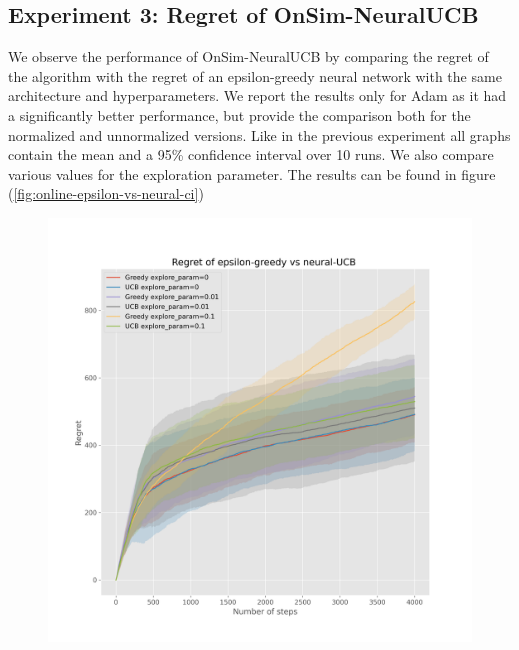 \documentclass{article}
\begin{document}
\subsection{Experiment 3: Regret of OnSim-NeuralUCB}
We observe the performance of OnSim-NeuralUCB by comparing the regret of the algorithm with the regret of an epsilon-greedy
neural network with the same architecture and hyperparameters. We report the results only for Adam as it had a significantly better performance,
but provide the comparison both for the normalized and unnormalized versions.
Like in the previous experiment all graphs contain the mean and a 95\% confidence interval over 10 runs.
 We also compare various values for the exploration parameter. The results can be found in figure (\ref{fig:online-epsilon-vs-neural-ci})

\begin{figure}[!h]
  \centering
  \begin{minipage}{.45\textwidth}
    \centering
    \includegraphics[width=\linewidth]{online-epsilon-vs-neural-reduced-nonormalized-ci}
  \end{minipage}%
  \begin{minipage}{.45\textwidth}
    \centering

\end{minipage}
\end{figure}
\end{document}
